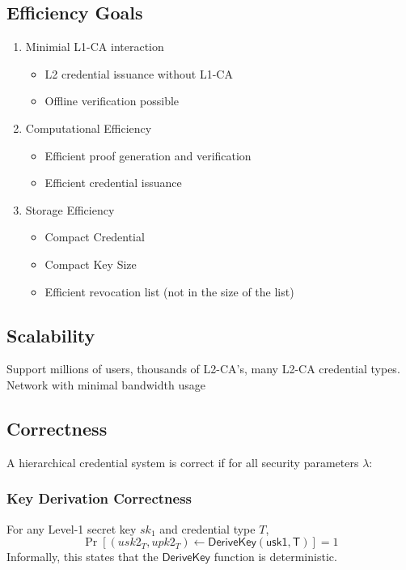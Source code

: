 \subsection{Efficiency Goals}
\begin{enumerate}
    \item Minimial L1-CA interaction
    \begin{itemize}
        \item L2 credential issuance without L1-CA
        \item Offline verification possible
    \end{itemize}

    \item Computational Efficiency
    \begin{itemize}
        \item Efficient proof generation and verification
        \item Efficient credential issuance
    \end{itemize}

    \item Storage Efficiency
    \begin{itemize}
        \item Compact Credential
        \item Compact Key Size
        \item Efficient revocation list (not in the size of the list)
    \end{itemize}
\end{enumerate}

\subsection{Scalability}
Support millions of users, thousands of L2-CA's, many L2-CA credential types. Network with minimal bandwidth usage


\subsection{Correctness}
A hierarchical credential system is correct if for all security parameters $\lambda$:
\subsubsection{Key Derivation Correctness}
For any Level-1 secret key $sk_1$ and credential type $T$, 
\[
    \Pr[(usk2_T, upk2_T) \gets \mathsf{DeriveKey(usk1, T)}] = 1
\]
Informally, this states that the $\mathsf{DeriveKey}$ function is deterministic.


